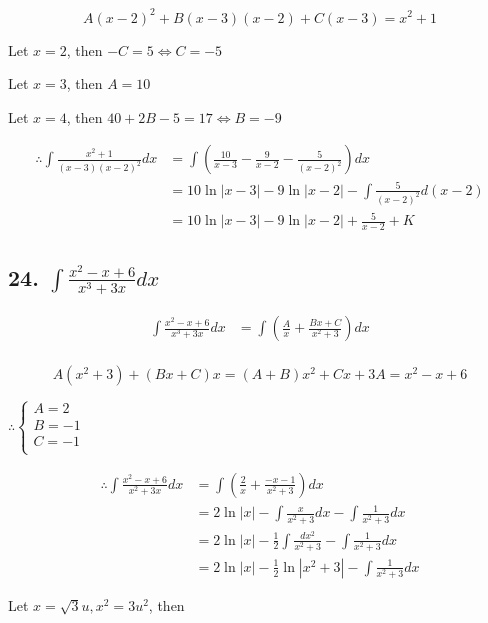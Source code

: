\documentclass{article}
\begin{document}
    $$A(x - 2)^2 + B(x - 3)(x - 2) + C(x - 3) = x^2 + 1$$

    Let $x = 2$, then $-C = 5 \iff C = -5$

    Let $x = 3$, then $A = 10$

    Let $x = 4$, then $40 + 2B - 5 = 17 \iff B = -9$

    $$\begin{aligned}
        \therefore \int \frac{x^2 + 1}{(x - 3)(x - 2)^2} dx &= \int (\frac{10}{x - 3} - \frac{9}{x - 2} - \frac{5}{(x - 2)^2}) dx \\
        &= 10 \ln |x - 3| - 9\ln |x - 2| - \int \frac{5}{(x - 2)^2} d(x - 2) \\
        &= 10\ln |x - 3| - 9\ln |x - 2| + \frac{5}{x - 2} + K
    \end{aligned}$$

    \subsection*{24. $\int \frac{x^2 - x + 6}{x^3 + 3x} dx$}

    $$\begin{aligned}
        \int \frac{x^2 - x + 6}{x^3 + 3x} dx &= \int (\frac{A}{x} + \frac{Bx + C}{x^2 + 3}) dx \\
    \end{aligned}$$

    $$A(x^2 + 3) + (Bx + C)x = (A + B)x^2 + Cx + 3A = x^2 - x + 6$$

    $\therefore \left\{ \begin{array}{ll}
        A = 2 \\
        B = -1 \\
        C = -1 \\
    \end{array} \right.$

    $$\begin{aligned}
        \therefore \int \frac{x^2 - x + 6}{x^2 + 3x} dx &= \int (\frac{2}{x} + \frac{-x - 1}{x^2 + 3}) dx \\
        &= 2\ln|x| - \int \frac{x}{x^2 + 3} dx - \int \frac{1}{x^2 + 3} dx \\
        &= 2\ln|x| - \frac 1 2 \int \frac{dx^2}{x^2 + 3} - \int \frac{1}{x^2 + 3} dx \\
        &= 2\ln|x| - \frac 1 2 \ln |x^2 + 3| - \int \frac{1}{x^2 + 3} dx
    \end{aligned}$$

    Let $x = \sqrt 3 u, x^2 = 3u^2$, then 
\end{document}
